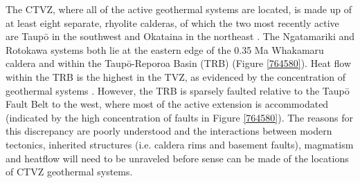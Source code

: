 The CTVZ, where all of the active geothermal systems are located, is made up of at least eight separate, rhyolite calderas, of which the two most recently active are Taup\={o} in the southwest and Okataina in the northeast \citep{Wilson_1995}. The Ngatamariki and Rotokawa systems both lie at the eastern edge of the 0.35 Ma Whakamaru caldera and within the Taup\={o}-Reporoa Basin (TRB) \citep{Wilson_2016,Downs_2014} (Figure \ref{764580}). Heat flow within the TRB is the highest in the TVZ, as evidenced by the concentration of geothermal systems \citep{Wilson_2016}. However, the TRB is sparsely faulted relative to the Taup\={o} Fault Belt to the west, where most of the active extension is accommodated (indicated by the high concentration of faults in Figure \ref{764580}). The reasons for this discrepancy are poorly understood and the interactions between modern tectonics, inherited structures (i.e. caldera rims and basement faults), magmatism and heatflow will need to be unraveled before sense can be made of the locations of CTVZ geothermal systems.

